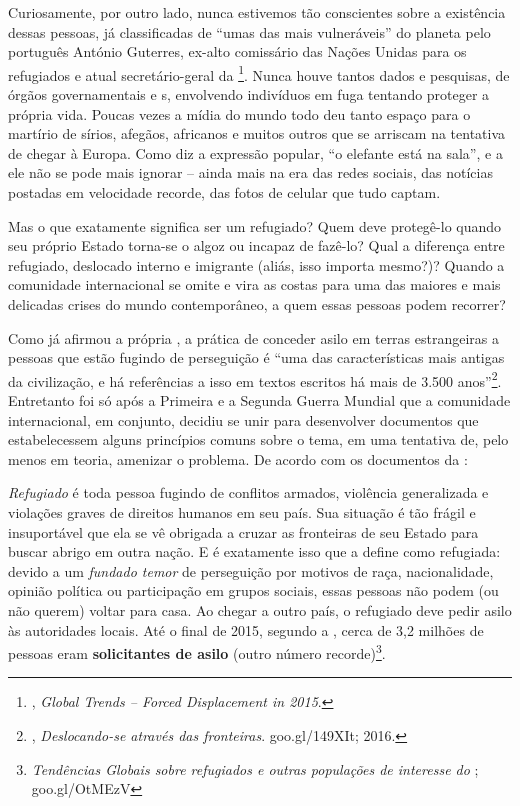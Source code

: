Curiosamente, por outro lado, nunca estivemos tão conscientes sobre a
existência dessas pessoas, já classificadas de ``umas das mais
vulneráveis'' do planeta pelo português António Guterres, ex-alto
comissário das Nações Unidas para os refugiados e atual secretário-geral
da \footnote{, \emph{Global Trends -- Forced Displacement in
  2015}.}.  Nunca houve tantos dados e pesquisas, de órgãos
governamentais e s, envolvendo indivíduos em fuga tentando proteger a
própria vida. Poucas vezes a mídia do mundo todo deu tanto espaço para o
martírio de sírios, afegãos, africanos e muitos outros que se arriscam
na tentativa de chegar à Europa. Como diz a expressão popular, ``o
elefante está na sala'', e a ele não se pode mais ignorar -- ainda mais
na era das redes sociais, das notícias postadas em velocidade recorde,
das fotos de celular que tudo captam.

Mas o que exatamente significa ser um refugiado? Quem deve protegê-lo
quando seu próprio Estado torna-se o algoz ou incapaz de fazê-lo? Qual a
diferença entre refugiado, deslocado interno e imigrante (aliás, isso
importa mesmo?)? Quando a comunidade internacional se omite e vira as
costas para uma das maiores e mais delicadas crises do mundo contemporâneo, a
quem essas pessoas podem recorrer?

Como já afirmou a própria , a prática de conceder asilo em terras
estrangeiras a pessoas que estão fugindo de perseguição é ``uma das
características mais antigas da civilização, e há referências a isso em
textos escritos há mais de 3.500 anos''\footnote{,
  \emph{Deslocando-se através das fronteiras}.
  {goo.gl/149XIt};
  2016.}. Entretanto foi só após a
Primeira e a Segunda Guerra Mundial que a comunidade internacional, em
conjunto, decidiu se unir para desenvolver documentos que estabelecessem
alguns princípios comuns sobre o tema, em uma tentativa de, pelo menos
em teoria, amenizar o problema. De acordo com os documentos da :

\textit{Refugiado} é toda pessoa fugindo de conflitos armados, violência
generalizada e violações graves de direitos humanos em seu país. Sua
situação é tão frágil e insuportável que ela se vê obrigada a cruzar as
fronteiras de seu Estado para buscar abrigo em outra nação. E é
exatamente isso que a define como refugiada: devido a um \emph{fundado
temor} de perseguição por motivos de raça, nacionalidade, opinião
política ou participação em grupos sociais, essas pessoas não podem (ou
não querem) voltar para casa. Ao chegar a outro país, o refugiado deve
pedir asilo às autoridades locais. Até o final de 2015, segundo a ,
cerca de 3,2 milhões de pessoas eram \textbf{solicitantes de asilo}
(outro número recorde)\footnote{\emph{Tendências Globais sobre
  refugiados e outras populações de interesse do };
  goo.gl/OtMEzV}.



